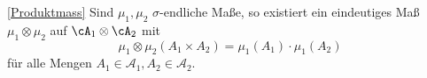 
\begin{satz}\ref{Produktmass}
	Sind $\mu_1,\mu_2$ $\sigma$-endliche Ma\ss e, so existiert ein eindeutiges Maß $\mu_1 \otimes \mu_2$ auf $\cA_1 \otimes \cA_2$ mit $$ \mu_1\otimes \mu_2(A_1\times A_2) = \mu_1(A_1) \cdot \mu_1(A_2)$$
		f\"ur alle Mengen $A_1\in \mathcal A_1, A_2\in \mathcal A_2$.
\end{satz}
